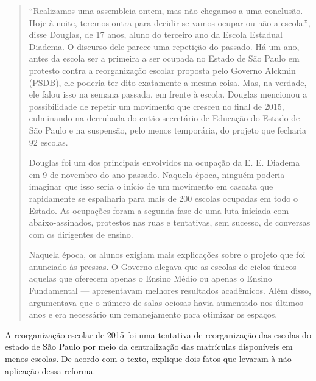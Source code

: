 \begin{quote}
``Realizamos uma assembleia ontem, mas não chegamos a uma conclusão.
Hoje à noite, teremos outra para decidir se vamos ocupar ou não a
escola.'', disse Douglas, de 17 anos, aluno do terceiro ano da Escola
Estadual Diadema. O discurso dele parece uma repetição do passado. Há um
ano, antes da escola ser a primeira a ser ocupada no Estado de São Paulo
em protesto contra a reorganização escolar proposta pelo Governo Alckmin
(PSDB), ele poderia ter dito exatamente a mesma coisa. Mas, na verdade,
ele falou isso na semana passada, em frente à escola. Douglas mencionou
a possibilidade de repetir um movimento que cresceu no final de 2015,
culminando na derrubada do então secretário de Educação do Estado de São
Paulo e na suspensão, pelo menos temporária, do projeto que fecharia 92
escolas.

Douglas foi um dos principais envolvidos na ocupação da E. E. Diadema em
9 de novembro do ano passado. Naquela época, ninguém poderia imaginar
que isso seria o início de um movimento em cascata que rapidamente se
espalharia para mais de 200 escolas ocupadas em todo o Estado. As
ocupações foram a segunda fase de uma luta iniciada com
abaixo-assinados, protestos nas ruas e tentativas, sem sucesso, de
conversas com os dirigentes de ensino.

Naquela época, os alunos exigiam mais explicações sobre o projeto que
foi anunciado às pressas. O Governo alegava que as escolas de ciclos
únicos --- aquelas que oferecem apenas o Ensino Médio ou apenas o Ensino
Fundamental --- apresentavam melhores resultados acadêmicos. Além disso,
argumentava que o número de salas ociosas havia aumentado nos últimos
anos e era necessário um remanejamento para otimizar os espaços.
\end{quote}


A reorganização escolar de 2015 foi uma tentativa de reorganização das
escolas do estado de São Paulo por meio da centralização das matrículas
disponíveis em menos escolas. De acordo com o texto, explique dois fatos
que levaram à não aplicação dessa reforma.


